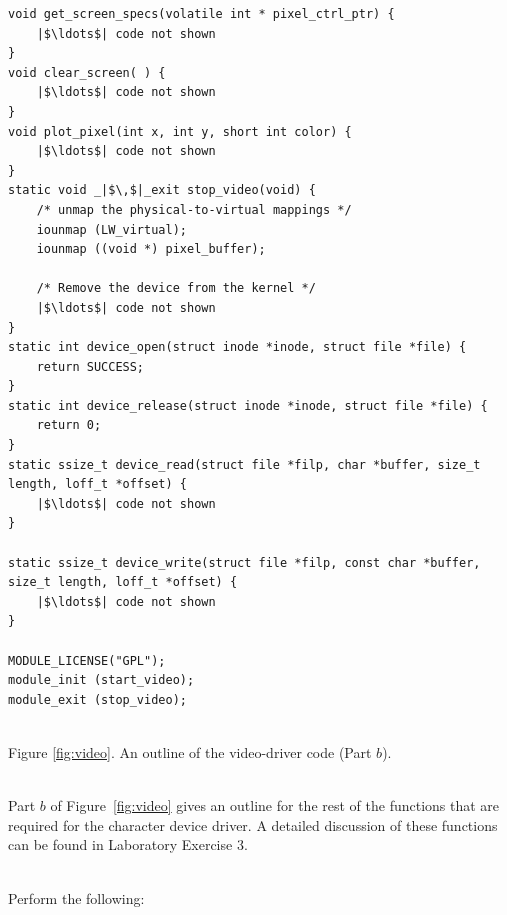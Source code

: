 \documentclass[epsfig,10pt,fullpage]{article}
\begin{document}
\clearpage
\newpage
\lstset{language=C,numbers=left,escapechar=|}
\begin{center}
\begin{minipage}[t]{12.5 cm}
\begin{lstlisting}[name=dots]
void get_screen_specs(volatile int * pixel_ctrl_ptr) {
    |$\ldots$| code not shown
}
void clear_screen( ) {
    |$\ldots$| code not shown
}
void plot_pixel(int x, int y, short int color) {
    |$\ldots$| code not shown
}
static void _|$\,$|_exit stop_video(void) {
    /* unmap the physical-to-virtual mappings */
    iounmap (LW_virtual);
    iounmap ((void *) pixel_buffer);

    /* Remove the device from the kernel */
    |$\ldots$| code not shown
}
static int device_open(struct inode *inode, struct file *file) {
    return SUCCESS;
}
static int device_release(struct inode *inode, struct file *file) {
    return 0;
}
static ssize_t device_read(struct file *filp, char *buffer, size_t length, loff_t *offset) {
    |$\ldots$| code not shown
}

static ssize_t device_write(struct file *filp, const char *buffer, size_t length, loff_t *offset) {
    |$\ldots$| code not shown
}

MODULE_LICENSE("GPL");
module_init (start_video);
module_exit (stop_video);
\end{lstlisting}
~\\
Figure \ref{fig:video}. An outline of the video-driver code (Part $b$).
\end{minipage}
\end{center}

~\\
\noindent
Part $b$ of Figure~\ref{fig:video} gives an outline for the rest of the functions that are
required for the character device driver. A detailed discussion of these functions can be
found in Laboratory Exercise 3.

~\\
\noindent
Perform the following:
\end{document}
